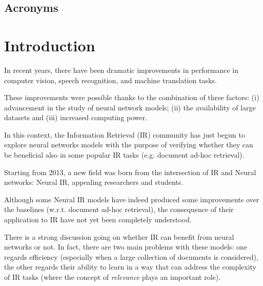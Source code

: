 \newpage
\begin{center}
\section*{Acronyms}
\begin{acronym}
\end{acronym}
\end{center}

\newpage
\chapter{Introduction}

In recent years, there have been dramatic improvements in performance in computer vision, speech recognition, and machine translation tasks.

These improvements were possible thanks to the combination of three factors: (i) advancement in the study of neural network models; (ii) the availability of large datasets and (iii) increased computing power.

In this context, the Information Retrieval (IR) community has just begun to explore neural networks models with the purpose of verifying whether they can be beneficial also in some popular IR tasks (e.g. document ad-hoc retrieval).

Starting from 2013, a new field was born from the intersection of IR and Neural networks: Neural IR, appealing researchers and students.

Although some Neural IR models have indeed produced some improvements over the baselines (w.r.t. document ad-hoc retrieval), the consequence of their application to IR have not yet been completely understood.

There is a strong discussion going on whether IR can benefit from neural networks or not. In fact, there are two main problems with these models: one regards efficiency (especially when a large collection of documents is considered), the other regards their ability to learn in a way that can address the complexity of IR tasks (where the concept of \textit{relevance} plays an important role).


